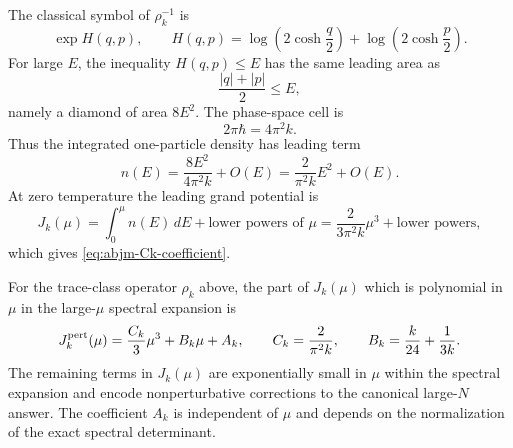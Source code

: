The classical symbol of \(\rho_k^{-1}\) is
\[
  \exp H(q,p),
  \qquad
  H(q,p)
  =
  \log\!\left(2\cosh\frac q2\right)
  +
  \log\!\left(2\cosh\frac p2\right).
\]
For large \(E\), the inequality \(H(q,p)\le E\) has the same leading area
as
\[
  \frac{|q|+|p|}{2}\le E,
\]
namely a diamond of area \(8E^2\).  The phase-space cell is
\[
  2\pi\hbar=4\pi^2 k .
\]
Thus the integrated one-particle density has leading term
\[
  n(E)
  =
  \frac{8E^2}{4\pi^2 k}+O(E)
  =
  \frac{2}{\pi^2 k}E^2+O(E).
\]
At zero temperature the leading grand potential is
\[
  J_k(\mu)
  =
  \int_0^\mu n(E)\,dE+\text{lower powers of }\mu
  =
  \frac{2}{3\pi^2 k}\mu^3+\text{lower powers},
\]
which gives \eqref{eq:abjm-Ck-coefficient}.

\begin{quotedtheorem}
\label{qt:abjm-perturbative-grand-potential}
For the trace-class operator \(\rho_k\) above, the part of \(J_k(\mu)\)
which is polynomial in \(\mu\) in the large-\(\mu\) spectral expansion is
\begin{equation}
  J_k^{\rm pert}(\mu)
  =
  \frac{C_k}{3}\mu^3+B_k\mu+A_k,
  \qquad
  C_k=\frac{2}{\pi^2 k},
  \qquad
  B_k=\frac{k}{24}+\frac1{3k}.
  \label{eq:abjm-perturbative-grand-potential}
\end{equation}
The remaining terms in \(J_k(\mu)\) are exponentially small in \(\mu\)
within the spectral expansion and encode nonperturbative corrections to the
canonical large-\(N\) answer.  The coefficient \(A_k\) is independent of
\(\mu\) and depends on the normalization of the exact spectral determinant.
\end{quotedtheorem}

